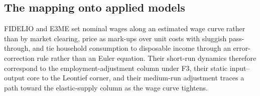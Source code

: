 \subsection*{The mapping onto applied models}
FIDELIO and E3ME set nominal wages along an estimated wage curve \citep{BlanchflowerOswald.1995} rather than by market clearing, price as mark-ups over unit costs with sluggish pass-through, and tie household consumption to disposable income through an error-correction rule rather than an Euler equation. Their short-run dynamics therefore correspond to the employment-adjustment column under F3, their static input--output core to the Leontief corner, and their medium-run adjustment traces a path toward the elastic-supply column as the wage curve tightens.
